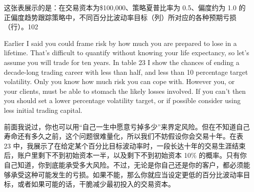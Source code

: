 \begin{chineseblock}这张表展示的是：在交易资本为\$100,000、策略夏普比率为 0.5、偏度约为 1.0 的正偏度趋势跟踪策略中，不同百分比波动率目标（列）所对应的各种预期亏损（行）。102 \end{chineseblock}

\bipairgap

\begin{englishblock} Earlier I said you could frame risk by how much you are prepared to lose in a lifetime. That’s difficult to quantify without knowing your life expectancy, so let’s assume you will trade for ten years. In table 23 I show the chances of ending a decade-long trading
career with less than half, and less than 10%
percentage target volatility. Only you know how much risk you can cope with. However you, or your clients, must be able to stomach the likely losses involved. If you can’t then you should set a lower percentage volatility target, or if possible consider using less initial trading capital. \end{englishblock}

\begin{chineseblock}前面我说过，你也可以用“自己一生中愿意亏掉多少”来界定风险。但在不知道自己寿命还有多久之前，这个问题很难量化，所以我们不妨假设你会交易十年。在表 23 中，我展示了在给定某个百分比目标波动率时，一段长达十年的交易生涯结束后，账户里剩下不到初始资本一半，以及剩下不到初始资本 10\% 的概率。只有你自己知道，你到底能承受多大风险。不过，无论是你自己还是你的客户，都必须能够承受这种可能发生的亏损。如果不能，那么你就应当设定更低的百分比波动率目标，或者如果可能的话，干脆减少最初投入的交易资本。\end{chineseblock}

\begin{bilingualtableblock} \begingroup \small \centering
{}
\par \endgroup \end{bilingualtableblock}

